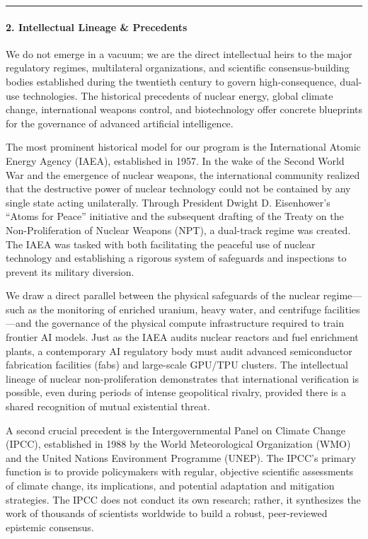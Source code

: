 \begin{center}\rule{0.5\linewidth}{0.5pt}\end{center}

\paragraph{2. Intellectual Lineage \&
Precedents}\label{intellectual-lineage-precedents-1}

We do not emerge in a vacuum; we are the direct intellectual heirs to
the major regulatory regimes, multilateral organizations, and scientific
consensus-building bodies established during the twentieth century to
govern high-consequence, dual-use technologies. The historical
precedents of nuclear energy, global climate change, international
weapons control, and biotechnology offer concrete blueprints for the
governance of advanced artificial intelligence.

The most prominent historical model for our program is the International
Atomic Energy Agency (IAEA), established in 1957. In the wake of the
Second World War and the emergence of nuclear weapons, the international
community realized that the destructive power of nuclear technology
could not be contained by any single state acting unilaterally. Through
President Dwight D. Eisenhower's ``Atoms for Peace'' initiative and the
subsequent drafting of the Treaty on the Non-Proliferation of Nuclear
Weapons (NPT), a dual-track regime was created. The IAEA was tasked with
both facilitating the peaceful use of nuclear technology and
establishing a rigorous system of safeguards and inspections to prevent
its military diversion.

We draw a direct parallel between the physical safeguards of the nuclear
regime---such as the monitoring of enriched uranium, heavy water, and
centrifuge facilities---and the governance of the physical compute
infrastructure required to train frontier AI models. Just as the IAEA
audits nuclear reactors and fuel enrichment plants, a contemporary AI
regulatory body must audit advanced semiconductor fabrication facilities
(fabs) and large-scale GPU/TPU clusters. The intellectual lineage of
nuclear non-proliferation demonstrates that international verification
is possible, even during periods of intense geopolitical rivalry,
provided there is a shared recognition of mutual existential threat.

A second crucial precedent is the Intergovernmental Panel on Climate
Change (IPCC), established in 1988 by the World Meteorological
Organization (WMO) and the United Nations Environment Programme (UNEP).
The IPCC's primary function is to provide policymakers with regular,
objective scientific assessments of climate change, its implications,
and potential adaptation and mitigation strategies. The IPCC does not
conduct its own research; rather, it synthesizes the work of thousands
of scientists worldwide to build a robust, peer-reviewed epistemic
consensus.

